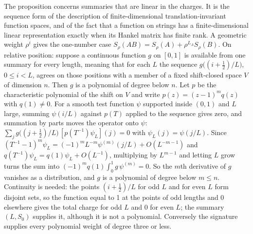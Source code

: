 \smallskip\noindent The proposition concerns summaries that are linear in the charges. It is the sequence form of the description of finite-dimensional translation-invariant function spaces\cite{anselone1964,szekelyhidi1982}, and of the fact that a function on strings has a finite-dimensional linear representation exactly when its Hankel matrix has finite rank\cite{schutzenberger1961,berstel2010}. A geometric weight $\rho^i$ gives the one-number case $S_\rho(AB)=S_\rho(A)+\rho^{L_A}S_\rho(B)$. On relative position: suppose a continuous function $g$ on $[0,1]$ is available from one summary for every length, meaning that for each $L$ the sequence $g\bigl((i+\tfrac12)/L\bigr)$, $0\le i<L$, agrees on those positions with a member of a fixed shift-closed space $V$ of dimension $n$. Then $g$ is a polynomial of degree below $n$. Let $p$ be the characteristic polynomial of the shift on $V$ and write $p(z)=(z-1)^m q(z)$ with $q(1)\neq0$. For a smooth test function $\psi$ supported inside $(0,1)$ and $L$ large, summing $\psi(i/L)$ against $p(T)$ applied to the sequence gives zero, and summation by parts moves the operator onto $\psi$: $\sum_j g\bigl((j+\tfrac12)/L\bigr)\,[p(T^{-1})\psi_L](j)=0$ with $\psi_L(j)=\psi(j/L)$. Since $(T^{-1}-1)^m\psi_L=(-1)^mL^{-m}\psi^{(m)}(j/L)+O(L^{-m-1})$ and $q(T^{-1})\psi_L=q(1)\psi_L+O(L^{-1})$, multiplying by $L^{m-1}$ and letting $L$ grow turns the sum into $(-1)^mq(1)\int_0^1 g\,\psi^{(m)}=0$. So the $m$th derivative of $g$ vanishes as a distribution, and $g$ is a polynomial of degree below $m\le n$. Continuity is needed: the points $(i+\tfrac12)/L$ for odd $L$ and for even $L$ form disjoint sets, so the function equal to 1 at the points of odd lengths and 0 elsewhere gives the total charge for odd $L$ and 0 for even $L$; the summary $(L,S_0)$ supplies it, although it is not a polynomial. Conversely the signature supplies every polynomial weight of degree three or less.

